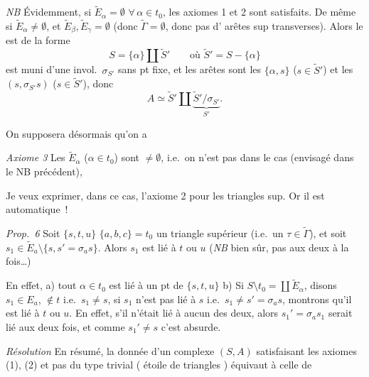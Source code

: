 \documentclass[11pt,a4paper]{article}
\begin{document}
\emph{NB} Évidemment, si $\widetilde{E}_{\alpha}=\emptyset$ $\forall\,\alpha\in t_0$, les axiomes \struck{\ill{}} 1 et 2 sont  satisfaits. De même si $\widetilde{E}_{\alpha}\neq\emptyset$, et $\widetilde{E}_{\beta},\widetilde{E}_{\gamma}=\emptyset$ (donc $\widetilde{\Gamma}=\emptyset$, donc pas d' arêtes sup transverses). Alors le \struck{\ill{}}  est \struck{\ill{}} de la forme
\[
  S=\{\alpha\}\amalg\widetilde{S}'\qquad\text{où }\widetilde{S}'=S-\{\alpha\}
\]
est muni d'une invol.\ $\sigma_{S'}$ sans pt fixe, et les arêtes sont les $\{\alpha,s\}$ ($s\in\widetilde{S}'$) et les $(s,\sigma_{S'}s)$ ($s\in\widetilde{S}'$), donc
\[
  A\simeq\widetilde{S}'\amalg\underbrace{\widetilde{S}'/\sigma_{S'}}_{S'} .
\]

On supposera désormais qu'on a 

\emph{Axiome 3} Les $\widetilde{E}_{\alpha}$ ($\alpha\in t_0$) sont $\neq\emptyset$, i.e.\ on n'est pas dans le cas  (envisagé dans le NB précédent),  

Je veux exprimer, dans ce cas, l'axiome 2 pour les triangles sup. Or il est automatique~!


\emph{Prop.~6} Soit $\{s,t,u\}$  $\{a,b,c\}=t_0$ un triangle supérieur (i.e.\ un $\tau\in\widetilde{\Gamma}$), et soit $s_1\in\widetilde{E}_a\setminus\{s,s'=\sigma_a s\}$. Alors $s_1$ est lié à $t$ ou $u$ (\emph{NB} bien sûr, pas aux deux à la fois…)

En effet, \struck{\ill{}} a) tout $\alpha\in t_0$ est lié à un pt de $\{s,t,u\}$ b) Si  $S\setminus t_0=\coprod\widetilde{E}_{\alpha}$,  disons $s_1\in E_a$,  $\notin t$ i.e.\ $s_1\neq s$, si $s_1$  \ill{} n'est pas lié à $s$ i.e.\ $s_1\neq s'=\sigma_a s$, montrons qu'il est lié à $t$ ou $u$. En effet, s'il n'était lié à aucun des deux, alors $s_1'=\sigma_a s_1$ serait lié aux deux  fois, et comme $s_1'\neq s$ c'est absurde.

\emph{Résolution} En résumé, la donnée d'un complexe $(S,A)$  satisfaisant les axiomes (1), (2) et  pas du type trivial  ( étoile de triangles
) équivaut à celle de
\end{document}
